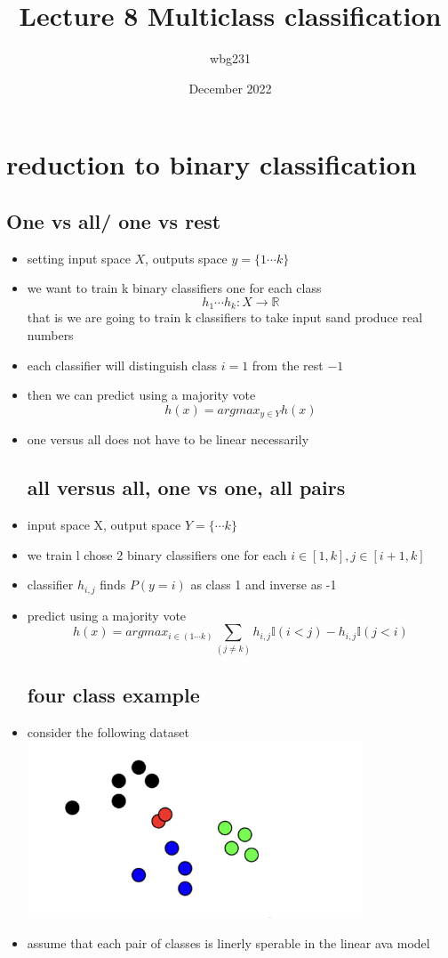 \documentclass{article}
\title{Lecture 8 Multiclass classification }
\author{wbg231 }
\date{December 2022}
\begin{document}
\maketitle

\section*{reduction to binary classification}
\subsection*{One vs all/ one vs rest }
\begin{itemize}
\item setting input space $X$, outputs space $y=\{1 \cdots k\}$
\item we want to train k binary classifiers one for each class $$h_1\cdots h_k: X\rightarrow \mathbb{R}$$ that is we are going to train k classifiers to take input sand produce real numbers 
\item  each classifier will distinguish class $i=1$ from the rest $-1$
\item then we can predict using a majority vote $$h(x)=argmax_{y\in Y}h(x)$$
\item one versus all does not have to be linear necessarily
\subsection*{all versus all, one vs one, all pairs }
\item input space X, output space $Y=\{\cdots k\}$
\item we train l chose 2 binary classifiers one for each $i\in [1,k], j\in [i+1,k]$
\item classifier $h_{i,j}$ finds $P(y=i)$ as class 1 and inverse as -1
\item predict using a majority vote $$h(x)=argmax_{i\in (1\cdots k)}\sum_{(j\neq k )}h_{i,j}\mathbb{I}(i<j)-h_{i,j}\mathbb{I}(j<i)$$
\subsection*{four class example}
\item consider the following dataset \\ \includegraphics*[width=10cm]{images/Screenshot 2023-05-14 at 3.13.35 PM.png}
\item assume that each pair of classes is linerly sperable in the linear ava model 

\end{itemize}
\end{document}

